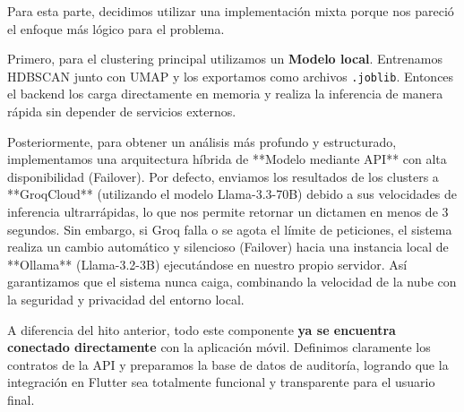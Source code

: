 Para esta parte, decidimos utilizar una implementación mixta porque nos pareció el enfoque más lógico para el problema. 

Primero, para el clustering principal utilizamos un \textbf{Modelo local}. Entrenamos HDBSCAN junto con UMAP y los exportamos como archivos \texttt{.joblib}. Entonces el backend los carga directamente en memoria y realiza la inferencia de manera rápida sin depender de servicios externos. 

Posteriormente, para obtener un análisis más profundo y estructurado, implementamos una arquitectura híbrida de **Modelo mediante API** con alta disponibilidad (Failover). Por defecto, enviamos los resultados de los clusters a **GroqCloud** (utilizando el modelo Llama-3.3-70B) debido a sus velocidades de inferencia ultrarrápidas, lo que nos permite retornar un dictamen en menos de 3 segundos. Sin embargo, si Groq falla o se agota el límite de peticiones, el sistema realiza un cambio automático y silencioso (Failover) hacia una instancia local de **Ollama** (Llama-3.2-3B) ejecutándose en nuestro propio servidor. Así garantizamos que el sistema nunca caiga, combinando la velocidad de la nube con la seguridad y privacidad del entorno local.

\begin{tcolorbox}[checklist,title={Reutilización y conexión}]
  A diferencia del hito anterior, todo este componente \textbf{ya se encuentra conectado directamente} con la aplicación móvil. Definimos claramente los contratos de la API y preparamos la base de datos de auditoría, logrando que la integración en Flutter sea totalmente funcional y transparente para el usuario final.
\end{tcolorbox}
